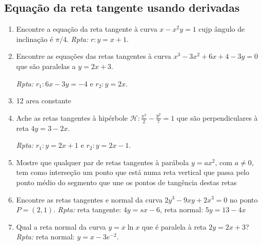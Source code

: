\documentclass[latin,20pt]{article}
\begin{document}
   \subsection{Equação da reta tangente usando derivadas}   
    \begin{enumerate}
    \item Encontre a equação da reta tangente à curva $x-x^{2}y=1$ cujp ângulo de inclinação é $\pi/4$. {\it Rpta: } $r: y=x+1$.
    \item Encontre as equações das retas tangentes à curva 
    $ x^{3}-3x^2+6x+4-3y=0$ que são paralelas a $y=2x+3$.
    
    {\it Rpta: } $r_{1}:6x-3y=-4$ e $r_{2}: y=2x$.
    \item 12 area constante 
    \item Ache as retas tangentes à hipérbole 
    $\mathcal{H}: \frac{x^2}{2}-\frac{y^2}{7}=1$ que são perpendiculares à reta $4y=3-2x$.
    
    {\it Rpta: } $r_{1}: y=2x+1$ e $r_{2}: y=2x-1$.
    \item Mostre que qualquer par de retas 
    tangentes à parábola $y=ax^{2}$, com 
    $a \neq 0$,  tem como interseção um ponto
    que está numa reta vertical que passa pelo ponto 
    médio do segmento que une os pontos de tangência
    destas retas 
    \item Encontre as retas tangentes e normal da curva 
    $2y^{3}-9xy+2x^{3}=0$ no ponto $P=(2,1)$. {\it Rpta: } 
    reta tangente: $4y=sx-6$, reta normal: $5y=13-4x$
    \item Qual a reta normal da curva $y=x \ln x$ que é paralela à reta 
    $2y=2x+3$? {\it Rpta:} reta normal: $y=x-3e^{-2}$. 
    \end{enumerate}    
\end{document}
